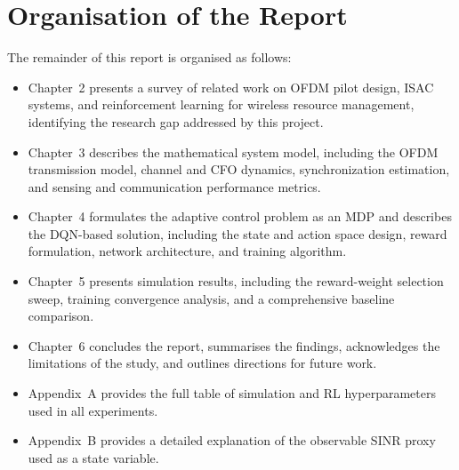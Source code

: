 \section{Organisation of the Report}

The remainder of this report is organised as follows:
\begin{itemize}
    \item[(1)] Chapter~2 presents a survey of related work on OFDM pilot design, ISAC systems, and reinforcement learning for wireless resource management, identifying the research gap addressed by this project.
    \item[(2)] Chapter~3 describes the mathematical system model, including the OFDM transmission model, channel and CFO dynamics, synchronization estimation, and sensing and communication performance metrics.
    \item[(3)] Chapter~4 formulates the adaptive control problem as an MDP and describes the DQN-based solution, including the state and action space design, reward formulation, network architecture, and training algorithm.
    \item[(4)] Chapter~5 presents simulation results, including the reward-weight selection sweep, training convergence analysis, and a comprehensive baseline comparison.
    \item[(5)] Chapter~6 concludes the report, summarises the findings, acknowledges the limitations of the study, and outlines directions for future work.
    \item[(6)] Appendix~A provides the full table of simulation and RL hyperparameters used in all experiments.
    \item[(7)] Appendix~B provides a detailed explanation of the observable SINR proxy used as a state variable.
\end{itemize}
